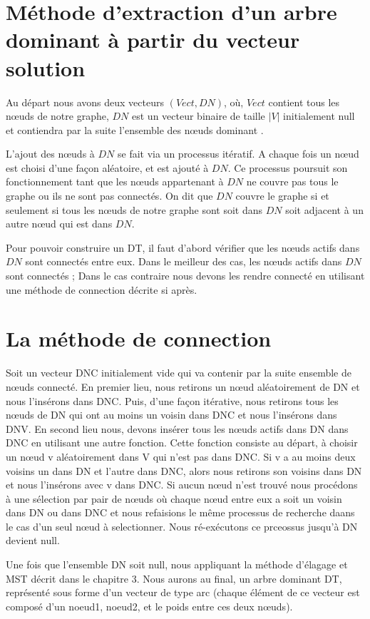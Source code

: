\section{Méthode d'extraction d'un arbre dominant à partir du vecteur solution}
Au départ nous avons deux vecteurs $(Vect, DN)$, où, $Vect$ contient tous les nœuds de notre graphe, $DN$ est un vecteur binaire de taille $|V|$ initialement null et contiendra par la suite l’ensemble des nœuds dominant .

L’ajout des nœuds à $DN$ se fait via un processus itératif. A chaque fois un nœud est choisi d’une façon aléatoire,  et est ajouté à $DN$. Ce processus poursuit son fonctionnement tant que les nœuds appartenant à $DN$ ne couvre pas tous le graphe ou ils ne sont pas  connectés. On dit que $DN$ couvre le graphe si et seulement si tous les nœuds de notre graphe sont soit dans $DN$ soit adjacent à un autre nœud qui est dans $DN$.

Pour pouvoir construire un DT, il faut d’abord vérifier  que les nœuds actifs dans $DN$  sont connectés entre eux. Dans le meilleur des cas, les nœuds actifs dans $DN$ sont connectés ; Dans le cas contraire nous devons les rendre connecté en utilisant une méthode de connection décrite si après.

\section{La méthode de connection}
Soit un vecteur DNC initialement vide qui va contenir par la suite ensemble de nœuds connecté. En premier lieu, nous retirons un nœud aléatoirement de DN et nous l’insérons dans DNC. Puis, d’une façon itérative, nous retirons tous les nœuds de DN qui ont au moins un voisin dans DNC et nous l’insérons dans DNV. En second lieu nous, devons insérer tous les nœuds actifs dans DN dans DNC en utilisant une autre fonction. Cette fonction consiste au départ, à choisir un nœud v aléatoirement dans V qui n’est pas dans DNC. Si v a au moins deux voisins un dans DN et l’autre dans DNC, alors nous retirons son voisins dans DN et nous l’insérons  avec v dans DNC. Si aucun nœud n’est trouvé nous procédons à une sélection par pair de nœuds où chaque nœud entre eux a soit un voisin dans DN ou dans DNC et nous refaisions le même processus de recherche daans le cas d’un seul nœud à selectionner. Nous ré-exécutons ce prceossus jusqu'à DN devient null.

Une fois que l’ensemble DN soit null, nous appliquant la méthode d’élagage et MST décrit dans le chapitre 3. Nous aurons au final, un arbre dominant DT, représenté sous forme d’un vecteur de type arc (chaque élément de ce vecteur est composé d’un noeud1, noeud2, et le poids entre ces deux nœuds).


